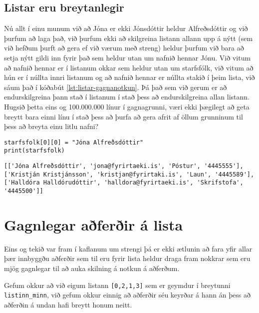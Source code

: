 \subsection{Listar eru breytanlegir}
Nú allt í einu munum við að Jóna er ekki Jónsdóttir heldur Alfreðsdóttir og við þurfum að laga það, við þurfum ekki að skilgreina listann allann upp á nýtt (sem við hefðum þurft að gera ef við værum með streng) heldur þurfum við bara að setja nýtt gildi inn fyrir það sem heldur utan um nafnið hennar Jónu.
Við vitum að nafnið hennar er í listanum okkar sem heldur utan um starfsfólk, við vitum að hún er í núllta innri listanum og að nafnið hennar er núllta stakið í þeim lista, við sáum það í kóðabút \ref{lst:listar-gagnanotkun}.
Þá það sem við gerum er að endurskilgreina þann stað í listanum í stað þess að endurskilgreina allan listann.
Hugsið þetta eins og 100.000.000 línur í gagnagrunni, væri ekki þægilegt að geta breytt bara einni línu í stað þess að þurfa að gera afrit af öllum grunninum til þess að breyta einu litlu nafni?

\begin{lstlisting}[caption=Unnið með gögn úr lista, label=lst:listar-gagnabreyting]
starfsfolk[0][0] = "Jóna Alfreðsdóttir"
print(starfsfolk)
\end{lstlisting}
\lstset{style=uttak}
\begin{lstlisting}
[['Jóna Alfreðsdóttir', 'jona@fyrirtaeki.is', 'Póstur', '4445555'], ['Kristján Kristjánsson', 'kristjan@fyrirtaki.is', 'Laun', '4445589'], ['Halldóra Halldórudóttir', 'halldora@fyrirtaeki.is', 'Skrifstofa', '4445500']]
\end{lstlisting}
\lstset{style=venjulegt}

\section{Gagnlegar aðferðir á lista}\label{uk:aðferðir-listar}

Eins og tekið var fram í kaflanum um strengi þá er ekki ætlunin að fara yfir allar þær innbyggðu aðferðir sem til eru fyrir lista heldur draga fram nokkrar sem eru mjög gagnlegar til að auka skilning á notkun á aðferðum.

Gefum okkur að við eigum listann \texttt{[0,2,1,3]} sem er geymdur í breytunni \texttt{listinn\_minn}, við gefum okkur einnig að aðferðir séu keyrðar á hann án þess að aðferðin á undan hafi breytt honum neitt.

